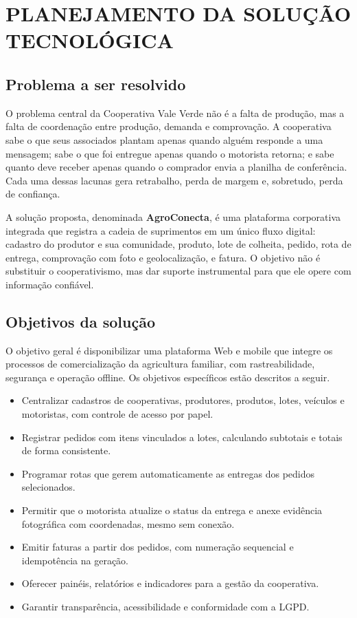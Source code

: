 \section{PLANEJAMENTO DA SOLUÇÃO TECNOLÓGICA}

\subsection{Problema a ser resolvido}

O problema central da Cooperativa Vale Verde não é a falta de produção, mas a
falta de coordenação entre produção, demanda e comprovação. A cooperativa sabe
o que seus associados plantam apenas quando alguém responde a uma mensagem; sabe
o que foi entregue apenas quando o motorista retorna; e sabe quanto deve receber
apenas quando o comprador envia a planilha de conferência. Cada uma dessas
lacunas gera retrabalho, perda de margem e, sobretudo, perda de confiança.

A solução proposta, denominada \textbf{AgroConecta}, é uma plataforma corporativa
integrada que registra a cadeia de suprimentos em um único fluxo digital:
cadastro do produtor e sua comunidade, produto, lote de colheita, pedido, rota de
entrega, comprovação com foto e geolocalização, e fatura. O objetivo não é
substituir o cooperativismo, mas dar suporte instrumental para que ele opere com
informação confiável.

\subsection{Objetivos da solução}

O objetivo geral é disponibilizar uma plataforma Web e mobile que integre os
processos de comercialização da agricultura familiar, com rastreabilidade,
segurança e operação offline. Os objetivos específicos estão descritos a seguir.

\begin{itemize}
  \item Centralizar cadastros de cooperativas, produtores, produtos, lotes,
    veículos e motoristas, com controle de acesso por papel.
  \item Registrar pedidos com itens vinculados a lotes, calculando subtotais e
    totais de forma consistente.
  \item Programar rotas que gerem automaticamente as entregas dos pedidos
    selecionados.
  \item Permitir que o motorista atualize o status da entrega e anexe evidência
    fotográfica com coordenadas, mesmo sem conexão.
  \item Emitir faturas a partir dos pedidos, com numeração sequencial e
    idempotência na geração.
  \item Oferecer painéis, relatórios e indicadores para a gestão da cooperativa.
  \item Garantir transparência, acessibilidade e conformidade com a LGPD.
\end{itemize}

